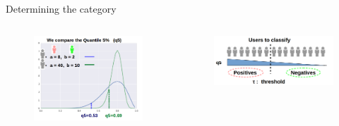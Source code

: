 \documentclass{beamer}
\begin{document}
\begin{frame}{Determining the category}

	\begin{columns}
		\begin{column}{0.49\textwidth}

\begin{figure}[h]
\begin{center}
\includegraphics[width=\columnwidth]{distribucion3.png}
\end{center}
\end{figure}
\end{column}

\begin{column}{0.49\textwidth}

\begin{figure}[h]
\begin{center}
\includegraphics[width=\columnwidth]{distribucion4.png}
\end{center}
\end{figure}


\end{column}
\end{columns}
\end{frame}
\end{document}
